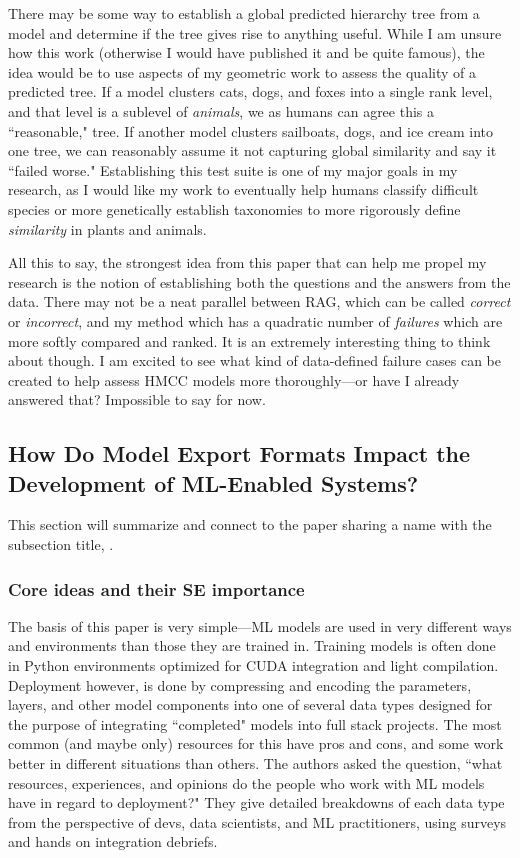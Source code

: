 \documentclass{article}
\begin{document}
There may be some way to establish a global predicted hierarchy tree from a model and determine if the tree gives rise to anything useful. 
While I am unsure how this work (otherwise I would have published it and be quite famous), the idea would be to use aspects of my geometric work to assess the quality of a predicted tree.
If a model clusters cats, dogs, and foxes into a single rank level, and that level is a sublevel of \textit{animals}, we as humans can agree this a ``reasonable," tree.
If another model clusters sailboats, dogs, and ice cream into one tree, we can reasonably assume it not capturing global similarity and say it ``failed worse."
Establishing this test suite is one of my major goals in my research, as I would like my work to eventually help humans classify difficult species or more genetically establish taxonomies to more rigorously define \textit{similarity} in plants and animals.

All this to say, the strongest idea from this paper that can help me propel my research is the notion of establishing both the questions and the answers from the data. 
There may not be a neat parallel between RAG, which can be called \textit{correct} or \textit{incorrect}, and my method which has a quadratic number of \textit{failures} which are more softly compared and ranked.
It is an extremely interesting thing to think about though. 
I am excited to see what kind of data-defined failure cases can be created to help assess HMCC models more thoroughly—or have I already answered that? Impossible to say for now.


\subsection{How Do Model Export Formats Impact the Development of ML-Enabled Systems?}
This section will summarize and connect to the paper sharing a name with the subsection title, \citep{Parida_2025}.


\subsubsection{Core ideas and their SE importance}
The basis of this paper is very simple—ML models are used in very different ways and environments than those they are trained in.
Training models is often done in Python environments optimized for CUDA integration and light compilation. 
Deployment however, is done by compressing and encoding the parameters, layers, and other model components into one of several data types designed for the purpose of integrating ``completed" models into full stack projects.
The most common (and maybe only) resources for this have pros and cons, and some work better in different situations than others.
The authors asked the question, ``what resources, experiences, and opinions do the people who work with ML models have in regard to deployment?"
They give detailed breakdowns of each data type from the perspective of devs, data scientists, and ML practitioners, using surveys and hands on integration debriefs. 
\end{document}
